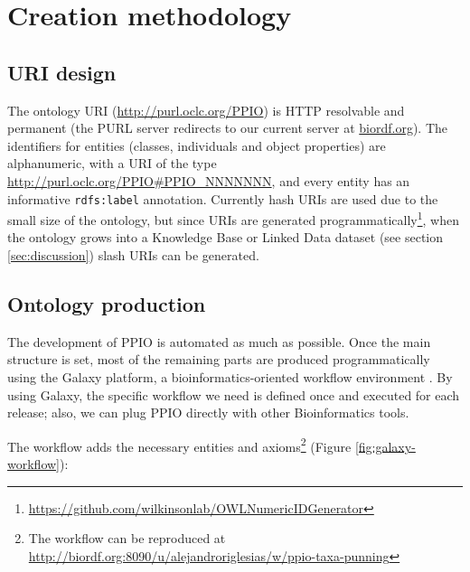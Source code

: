 \documentclass[sw]{iosart2c}
\newcommand{\myurl}[1]{\footnote{\url{#1}}}
\newcommand{\con}[1]{\texttt{#1}\xspace}
\begin{document}
\section{Creation methodology}

\subsection{URI design}
The ontology URI (\url{http://purl.oclc.org/PPIO}) is HTTP resolvable and permanent (the PURL server redirects to our current server at \url{biordf.org}). The identifiers for entities (classes, individuals and object properties) are alphanumeric, with a URI of the type \url{http://purl.oclc.org/PPIO#PPIO_NNNNNNN}, and every entity has an informative \con{rdfs:label} annotation. Currently hash URIs are used due to the small size of the ontology, but since URIs are generated programmatically\myurl{https://github.com/wilkinsonlab/OWLNumericIDGenerator}, when the ontology grows into a Knowledge Base or Linked Data dataset (see section \ref{sec:discussion}) slash URIs can be generated.

\subsection{Ontology production}
The development of PPIO is automated as much as possible. Once the main structure is set, most of the remaining parts are produced programmatically using the Galaxy platform, a bioinformatics-oriented workflow environment \cite{galaxy}. By using Galaxy, the specific workflow we need is defined once and executed for each release; also, we can plug PPIO directly with other Bioinformatics tools. 

The workflow adds the necessary entities and axioms\footnote{The workflow can be reproduced at \url{http://biordf.org:8090/u/alejandroriglesias/w/ppio-taxa-punning}} (Figure \ref{fig:galaxy-workflow}):
\end{document}
